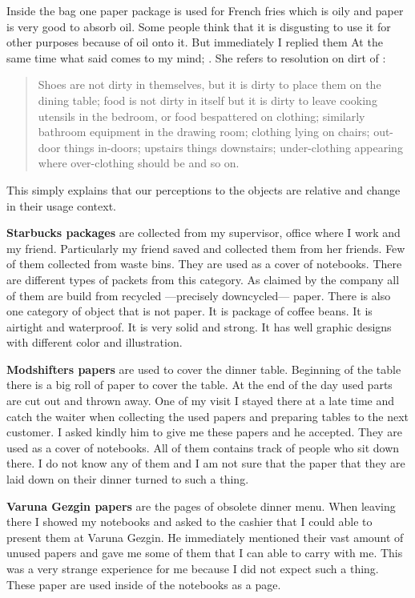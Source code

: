 Inside the bag one paper package is used for French fries which is oily and paper is very good to absorb oil. Some people think that it is disgusting to use it for other purposes because of oil onto it. But immediately I replied them  At the same time what \cite[5]{strasser1999waste} said comes to my mind; . She refers to resolution on dirt of \cite[36]{douglas2003purity}:
\begin{quote}
Shoes are not dirty in themselves, but it is dirty to place them on the dining table; food is not dirty in itself but it is dirty to leave cooking utensils in the bedroom, or food bespattered on clothing; similarly bathroom equipment in the drawing room; clothing lying on chairs; out-door things in-doors; upstairs things downstairs; under-clothing appearing where over-clothing should be and so on.
\end{quote}

This simply explains that our perceptions to the objects are relative and change in their usage context.

\textbf{Starbucks packages} are collected from my supervisor, office where I work and my friend. Particularly my friend saved and collected them from her friends. Few of them collected from waste bins. They are used as a cover of notebooks. There are different types of packets from this category. As claimed by the company all of them are build from recycled ---precisely downcycled--- paper. There is also one category of object that is not paper. It is package of coffee beans. It is airtight and waterproof. It is very solid and strong. It has well graphic designs with different color and illustration.

\textbf{Modshifters papers} are used to cover the dinner table. Beginning of the table there is a big roll of paper to cover the table. At the end of the day used parts are cut out and thrown away. One of my visit I stayed there at a late time and catch the waiter when collecting the used papers and preparing tables to the next customer. I asked kindly him to give me these papers and he accepted. They are used as a cover of notebooks. All of them contains track of people who sit down there. I do not know any of them and I am not sure that the paper that they are laid down on their dinner turned to such a thing.

\textbf{Varuna Gezgin papers} are the pages of obsolete dinner menu. When leaving there I showed my notebooks and asked to the cashier that I could able to present them at Varuna Gezgin. He immediately mentioned their vast amount of unused papers and gave me some of them that I can able to carry with me. This was a very strange experience for me because I did not expect such a thing. These paper are used inside of the notebooks as a page.

